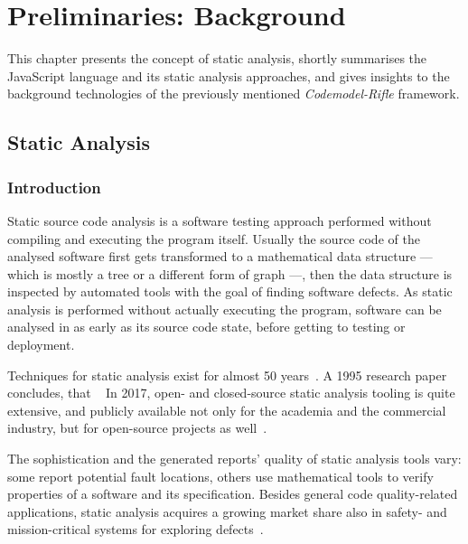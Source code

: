 \chapter{Preliminaries: Background}
\label{chapter:background}

This chapter presents the concept of static analysis, shortly summarises the JavaScript language and its static analysis approaches, and gives insights to the background technologies of the previously mentioned \emph{Codemodel-Rifle} framework.


\section{Static Analysis}

\subsection{Introduction}

Static source code analysis is a software testing approach performed without compiling and executing the program itself. Usually the source code of the analysed software first gets transformed to a mathematical data structure — which is mostly a tree or a different form of graph —, then the data structure is inspected by automated tools with the goal of finding software defects. As static analysis is performed without actually executing the program, software can be analysed in as early as its source code state, before getting to testing or deployment.

Techniques for static analysis exist for almost 50 years~\cite{emanuelsson2008comparative}. A 1995 research paper concludes, that ~\cite{373902} In 2017, open- and closed-source static analysis tooling is quite extensive, and publicly available not only for the academia and the commercial industry, but for open-source projects as well~\cite{wikipedia-static-analysis}.

The sophistication and the generated reports' quality of static analysis tools vary: some report potential fault locations, others use mathematical tools to verify properties of a software and its specification. Besides general code quality-related applications, static analysis acquires a growing market share also in safety- and mission-critical systems for exploring defects~\cite{livshits2006improving}.


